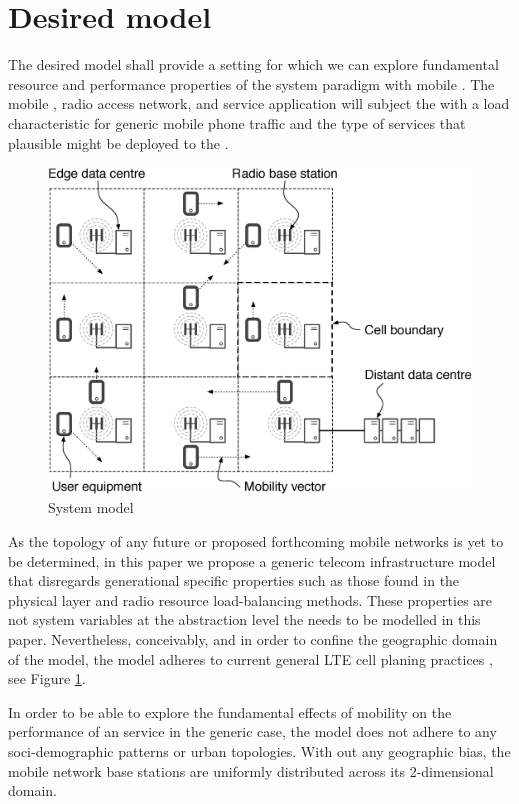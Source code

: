 \section{Desired model}

The desired model shall provide a setting for which we can explore fundamental resource and performance properties of the \xcloud{} system paradigm with mobile \ues{}. The mobile \ues{}, radio access network, and service application will subject the \dcs{} with a load characteristic for generic mobile phone traffic and the type of services that plausible might be deployed to the \xcloud{}.

\begin{figure}[tb]
	\centering
	\includegraphics[width=\linewidth]{fig_system_model.eps} 
	\caption{System model}
	\label{fig:system_model}
\end{figure}

As the topology of any future \xcloud{} or proposed forthcoming mobile networks is yet to be determined, in this paper we propose a generic telecom infrastructure model that disregards generational specific properties such as those found in the physical layer and radio resource load-balancing methods. These properties are not system variables at the abstraction level the \xcloud needs to be modelled in this paper. Nevertheless, conceivably, and in order to confine the geographic domain of the model, the model adheres to current general LTE cell planing practices \cite{salo2010practical}, see Figure \ref{fig:system_model}.

In order to be able to explore the fundamental effects of mobility on the performance of an \xcloud service in the generic case, the model does not adhere to any soci-demographic patterns or urban topologies. With out any geographic bias, the mobile network base stations are uniformly distributed across its 2-dimensional domain.

